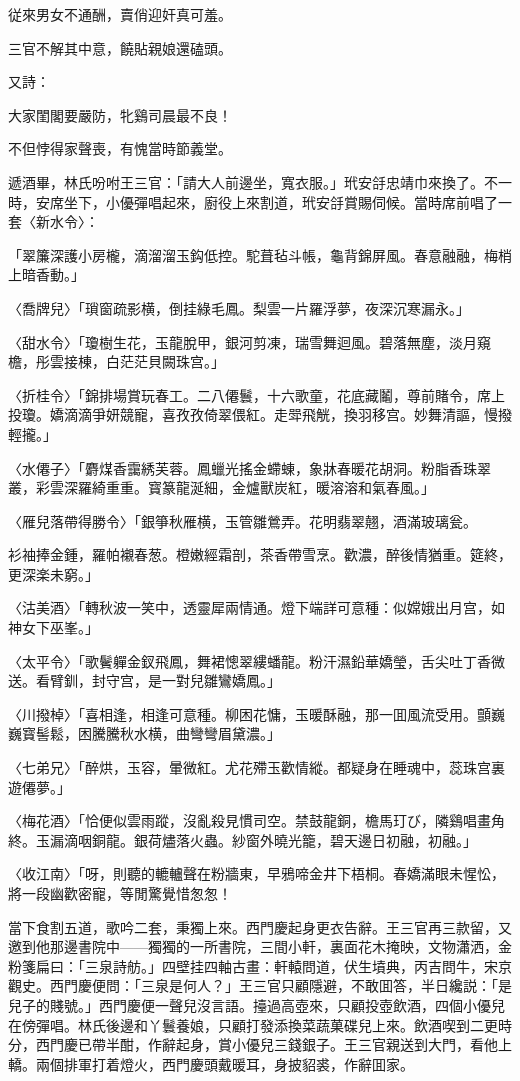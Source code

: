 従來男女不通酬，賣俏迎奸真可羞。

三官不解其中意，饒貼親娘還磕頭。

又詩：

大家閨閣要嚴防，牝鷄司晨最不良！

不但悖得家聲喪，有愧當時節義堂。

遞酒畢，林氏吩咐王三官：「請大人前邊坐，寬衣服。」玳安㧱忠靖巾來換了。不一時，安席坐下，小優彈唱起來，廚役上來割道，玳安㧱賞賜伺候。當時席前唱了一套〈新水令〉：

「翠簾深護小房櫳，滴溜溜玉鈎低控。駝葺毡斗帳，龜背錦屏風。春意融融，梅梢上暗香動。」

〈喬牌兒〉「瑣窗疏影横，倒挂綠毛鳳。梨雲一片羅浮夢，夜深沉寒漏永。」

〈甜水令〉「瓊樹生花，玉龍脫甲，銀河剪凍，瑞雪舞迴風。碧落無塵，淡月窺檐，彤雲接棟，白茫茫貝闕珠宫。」

〈折桂令〉「錦排場賞玩春工。二八僊鬟，十六歌童，花底藏鬮，尊前賭令，席上投瓊。嬌滴滴爭妍競寵，喜孜孜倚翠偎紅。走斝飛觥，換羽移宫。妙舞清謳，慢撥輕攏。」

〈水僊子〉「麝煤香靄綉芙蓉。鳳蠟光搖金螮蝀，象牀春暖花胡洞。粉脂香珠翠叢，彩雲深羅綺重重。寳篆龍涎細，金爐獸炭紅，暖溶溶和氣春風。」

〈雁兒落帶得勝令〉「銀箏秋雁横，玉管雛鶯弄。花明翡翠翹，酒滿玻璃瓮。

衫袖捧金鍾，羅帕襯春葱。橙嫩經霜剖，茶香帶雪烹。歡濃，醉後情猶重。筵終，更深楽未窮。」

〈沽美酒〉「轉秋波一笑中，透靈犀兩情通。燈下端詳可意種：似嫦娥出月宫，如神女下巫峯。」

〈太平令〉「歌鬢軃金釵飛鳳，舞裙憁翠縷蟠龍。粉汗濕鉛華嬌瑩，舌尖吐丁香微送。看臂釧，封守宫，是一對兒雛鸞嬌鳳。」

〈川撥棹〉「喜相逢，相逢可意種。柳困花慵，玉暖酥融，那一囬風流受用。顫巍巍寳髻鬆，困騰騰秋水横，曲彎彎眉黛濃。」

〈七弟兄〉「醉烘，玉容，暈微紅。尤花殢玉歡情縱。都疑身在睡魂中，蕊珠宫裏遊僊夢。」

〈梅花酒〉「恰便似雲雨蹤，沒亂殺見慣司空。禁鼓龍銅，檐馬玎び，隣鷄唱畫角終。玉漏滴咽銅龍。銀荷燼落火蟲。紗窗外曉光籠，碧天邊日初融，初融。」

〈收江南〉「呀，則聽的轆轤聲在粉牆東，早鴉啼金井下梧桐。春嬌滿眼未惺忪，將一段幽歡密寵，等閒驚覺惜怱怱！

當下食割五道，歌吟二套，秉獨上來。西門慶起身更衣告辭。王三官再三款留，又邀到他那邊書院中——獨獨的一所書院，三間小軒，裏面花木掩映，文物瀟洒，金粉箋扁曰：「三泉詩舫。」四壁挂四軸古畫：軒轅問道，伏生墳典，丙吉問牛，宋京觀史。西門慶便問：「三泉是何人？」王三官只顧隱避，不敢囬答，半日纔説：「是兒子的賤號。」西門慶便一聲兒沒言語。擡過高壺來，只顧投壺飲酒，四個小優兒在傍彈唱。林氏後邊和丫鬟養娘，只顧打發添換菜蔬菓碟兒上來。飲酒喫到二更時分，西門慶已帶半酣，作辭起身，賞小優兒三錢銀子。王三官親送到大門，看他上轎。兩個排軍打着燈火，西門慶頭戴暖耳，身披貂裘，作辭囬家。

